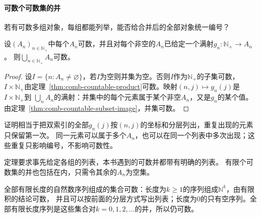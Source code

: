 \paragraph{可数个可数集的并}
若有可数多组对象，每组都能列举，能否给合并后的全部对象统一编号？
\begin{theorem}[可数并的可数性]
\label{thm:comb-countable-union}
设$(A_n)_{n\in\mathbb N_+}$中每个$A_n$可数，并且对每个非空的$A_n$已给定一个满射$g_n:\mathbb N_+\to A_n$。
则$\bigcup_{n\in\mathbb N_+}A_n$可数。
\end{theorem}
\begin{proof}
设$I=\{n:A_n\neq\varnothing\}$，若$I$为空则并集为空。否则$I$作为$\mathbb N_+$的子集可数，
$I\times\mathbb N_+$由定理~\ref{thm:comb-countable-product}可数。映射$(n,j)\mapsto g_n(j)$是$I\times\mathbb N_+$到
$\bigcup_nA_n$的满射：并集中的每个元素属于某个非空$A_n$，又是$g_n$的某个值。由定理~\ref{thm:comb-countable-subset-image}，并集可数。
\end{proof}
证明相当于把双索引的全部$g_n(j)$按$(n,j)$的坐标和分层列出，重复出现的元素只保留第一次。
同一元素可以属于多个$A_n$，也可以在同一个列表中多次出现；这些重复只影响编号，不影响可数性。

定理要求事先给定各组的列表，本书遇到的可数并都带有明确的列表。
有限个可数集的并也包括在内，只需令其余的$A_n$为空集。
\begin{example}[有限长度序列的全体]
\label{ex:card-finite-sequences}
全部有限长度的自然数序列组成的集合可数：长度为$k\geq1$的序列组成$\mathbb N^k$，由有限积的结论可数，
并且可以按前面的分层方式写出列表；长度为$0$的只有空序列。全部有限长度序列是这些集合对$k=0,1,2,\ldots$的并，所以仍可数。
\end{example}

